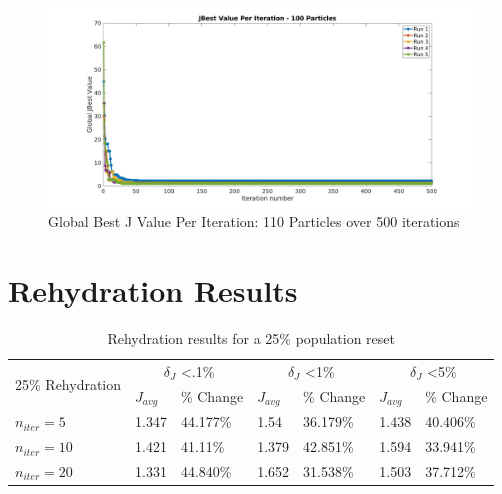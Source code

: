 \begin{figure}[H]
    \includegraphics[width=\linewidth]{./jpgs/globalBestPerIteration500.jpg}
    \caption{Global Best J Value Per Iteration: 110 Particles over 500 iterations}
    \end{figure}
\section{Rehydration Results }

\begin{table}[H]
  \centering
  \begin{tabular}{lll|ll|ll}
    \toprule
    \multirow{2}{*}{25\% Rehydration} &
      \multicolumn{2}{c}{$\delta_{J}$ \textless .1\%} &
      \multicolumn{2}{c}{$\delta_{J}$ \textless 1\%} &
      \multicolumn{2}{c}{$\delta_{J}$ \textless 5\%} \\
      \cmidrule{2-7}
    & $J_{avg}$ & \% Change & $J_{avg}$ & \% Change & $J_{avg}$ & \% Change \\
    \midrule

    $n_{iter}=5$ & 1.347 & 44.177\% & 1.54 & 36.179\% & 1.438 & 40.406\% \\
    $n_{iter}=10$ & 1.421 & 41.11\% & 1.379 & 42.851\% & 1.594 & 33.941\% \\
    $n_{iter}=20$ & 1.331 & 44.840\% & 1.652 & 31.538\% & 1.503 & 37.712\% \\
    \bottomrule
  \end{tabular}
  \caption{Rehydration results for a 25\% population reset}
  \label{tab:rehydation-p25}
\end{table}

